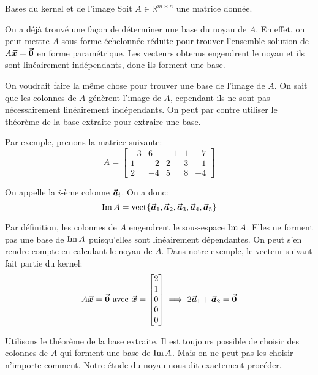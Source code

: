 \documentclass[a4paper]{article}
\begin{document}
\begin{parag}{Bases du kernel et de l'image}
    Soit $A \in \mathbb{R}^{m \times n}$ une matrice donnée.

    On a déjà trouvé une façon de déterminer une base du noyau de $A$. En effet, on peut mettre $A$ sous forme échelonnée réduite pour trouver l'ensemble solution de $A \bm{\protect\vec{x}} = \bm{\protect\vec{0}}$ en forme paramétrique. Les vecteurs obtenus engendrent le noyau et ils sont linéairement indépendants, donc ils forment une base.

    On voudrait faire la même chose pour trouver une base de l'image de $A$. On sait que les colonnes de $A$ génèrent l'image de $A$, cependant ils ne sont pas nécessairement linéairement indépendants. On peut par contre utiliser le théorème de la base extraite pour extraire une base.

    Par exemple, prenons la matrice suivante:
    \[A = \begin{bmatrix} -3 & 6 & -1 & 1 & -7 \\ 1 & -2 & 2 & 3 & -1 \\ 2 & -4 & 5 & 8 & -4 \end{bmatrix}\]

    On appelle la $i$-ème colonne $\bm{\protect\vec{a}}_i$. On a donc:
    \[\im A = \vect\left\{\bvec{a}_1, \bvec{a}_2, \bvec{a}_3, \bvec{a}_4, \bvec{a}_5\right\}\]

    Par définition, les colonnes de $A$ engendrent le sous-espace $\operatorname{Im} A$. Elles ne forment pas une base de $\operatorname{Im} A$ puisqu'elles sont linéairement dépendantes. On peut s'en rendre compte en calculant le noyau de $A$. Dans notre exemple, le vecteur suivant fait partie du kernel:
    \[A \bm{\protect\vec{x}} = \bm{\protect\vec{0}} \text{ avec }\bm{\protect\vec{x}} = \begin{bmatrix} 2 \\ 1 \\ 0 \\ 0 \\ 0 \end{bmatrix} \implies 2\bm{\protect\vec{a}}_1 + \bm{\protect\vec{a}}_2 = \bm{\protect\vec{0}}\]


    Utilisons le théorème de la base extraite. Il est toujours possible de choisir des colonnes de $A$ qui forment une base de $\operatorname{Im} A$. Mais on ne peut pas les choisir n'importe comment. Notre étude du noyau nous dit exactement procéder.


\end{parag}
\end{document}
